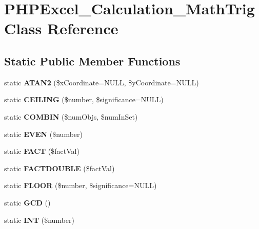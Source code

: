 \section{P\+H\+P\+Excel\+\_\+\+Calculation\+\_\+\+Math\+Trig Class Reference}
\label{class_p_h_p_excel___calculation___math_trig}
\subsection*{Static Public Member Functions}
\begin{DoxyCompactItemize}
\item 
static {\bfseries A\+T\+A\+N2} (\$x\+Coordinate=N\+U\+L\+L, \$y\+Coordinate=N\+U\+L\+L)\label{class_p_h_p_excel___calculation___math_trig_a6a99905e4006ad19b29f97f59800395f}

\item 
static {\bfseries C\+E\+I\+L\+I\+N\+G} (\$number, \$significance=N\+U\+L\+L)\label{class_p_h_p_excel___calculation___math_trig_a3edece0e629f199bb23ee8dd3ff59054}

\item 
static {\bfseries C\+O\+M\+B\+I\+N} (\$num\+Objs, \$num\+In\+Set)\label{class_p_h_p_excel___calculation___math_trig_a749200dc830f248ae55825d81f933ace}

\item 
static {\bfseries E\+V\+E\+N} (\$number)\label{class_p_h_p_excel___calculation___math_trig_ac674dfb7269fdab7318f2576a9dfa22c}

\item 
static {\bfseries F\+A\+C\+T} (\$fact\+Val)\label{class_p_h_p_excel___calculation___math_trig_af426441d69fbfcbc29e4881a5036d253}

\item 
static {\bfseries F\+A\+C\+T\+D\+O\+U\+B\+L\+E} (\$fact\+Val)\label{class_p_h_p_excel___calculation___math_trig_a8d711a8e48336ddbba58138c300941f2}

\item 
static {\bfseries F\+L\+O\+O\+R} (\$number, \$significance=N\+U\+L\+L)\label{class_p_h_p_excel___calculation___math_trig_a453e086876dcca39d5ac88698db1fd8b}

\item 
static {\bfseries G\+C\+D} ()\label{class_p_h_p_excel___calculation___math_trig_a7c5e193ed8cc01479a5293b338c7d181}

\item 
static {\bfseries I\+N\+T} (\$number)\label{class_p_h_p_excel___calculation___math_trig_a1d3cdd47d14edc61eada06cc31226019}


\end{DoxyCompactItemize}
